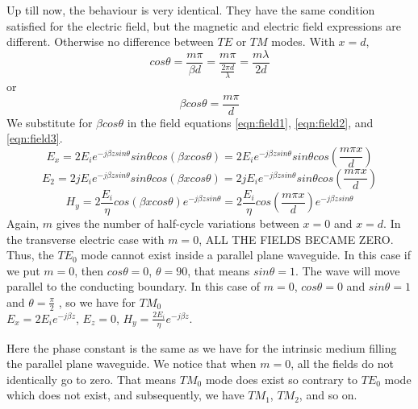 Up till now, the behaviour is very identical. They have the same condition satisfied for the electric field, but the magnetic and electric field expressions are different. Otherwise no difference between $TE$ or $TM$ modes. With $x = d$,
\begin{dmath*}
cos\theta = \frac{m \pi}{\beta d} =\frac{m \pi}{\frac{2\pi d}{\lambda}} = \frac{m\lambda}{2d}
\end{dmath*} 
or
\begin{dmath*}
\beta cos\theta = \frac{m \pi}{d}
\end{dmath*}
We substitute for $\beta cos\theta$ in the field equations \ref{eqn:field1}, \ref{eqn:field2}, and \ref{eqn:field3}.
\begin{dmath}
E_{x} = 2 E_{i} e^{-j\beta zsin\theta} sin\theta cos(\beta xcos\theta) = 2 E_{i} e^{-j\beta zsin\theta} sin\theta cos(\frac{m\pi x}{d})
\end{dmath}
\begin{dmath}
E_{2} = 2 jE_{i} e^{-j\beta zsin\theta} sin\theta cos(\beta xcos\theta) = 2 jE_{i} e^{-j\beta zsin\theta} sin\theta cos(\frac{m\pi x}{d})
\end{dmath}
\begin{dmath}
H_{y} = 2 \frac{E_{i}}{\eta} cos(\beta xcos\theta) e^{-j\beta zsin\theta} =2 \frac{E_{i}}{\eta} cos(\frac{m\pi x}{d}) e^{-j\beta zsin\theta} 
\end{dmath}
Again, $m$ gives the number of half-cycle variations between $x = 0$ and $x = d$. In the transverse electric case with $m = 0$, ALL THE FIELDS BECAME ZERO. Thus, the $TE_0$ mode cannot exist inside a parallel plane waveguide. In this case if we put $m = 0$, then $cos\theta =0$, $\theta =90$, that means $sin\theta =1$. The wave will move parallel to the conducting boundary. In this case of $m = 0$, $cos\theta =0$ and $sin\theta =1$ and $\theta=\frac{\pi}{2}$ , so we have for $TM_0$\\ 
$E_{x} =2E_{i} e^{-j\beta z}$, $E_{z}= 0$, $H_{y} =\frac{2E_{i}}{\eta} e^{-j\beta z}$.

Here the phase constant is the same as we have for the intrinsic medium filling the parallel plane waveguide. We notice that when $m = 0$, all the fields do not identically go to zero. That means $TM_0$ mode does exist so contrary to $TE_0$ mode which does not exist, and subsequently, we have $TM_{1}$, $TM_{2}$, and so on. 

